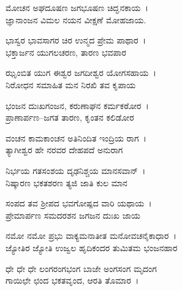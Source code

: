 \begin{myquote}
ಮೋಚನ ಅಘದೂಷಣ ಜಗಭೂಷಣ ಚಿದ್ಘನಕಾಯ~।\\ಜ್ಞಾನಾಂಜನ ವಿಮಲ ನಯನ ವೀಕ್ಷಣೆ ಮೋಹಜಾಯ.
\end{myquote}


\begin{myquote}
ಭಾಸ್ವರ ಭಾವಸಾಗರ ಚಿರ ಉನ್ಮದ ಪ್ರೇಮ ಪಾಥಾರ~।\\ಭಕ್ತಾರ್ಜನ ಯುಗಲಚರಣ, ತಾರಣ ಭವಪಾರ
\end{myquote}


\begin{myquote}
ಝೃಂಬಿತ ಯುಗ ಈಶ್ವರ ಜಗದೀಶ್ವರ ಯೋಗಸಹಾಯ~।\\ನಿರೋಧನ ಸಮಾಹಿತ ಮನ ನಿರಖಿ ತವ ಕೃಪಾಯ
\end{myquote}


\begin{myquote}
ಭಂಜನ ದುಃಖಗಂಜನ, ಕರುಣಾಘನ ಕರ್ಮಕಠೋರ~।\\ಪ್ರಾಣಾರ್ಪಣ–ಜಗತ ತಾರಣ, ಕೃಂತನ ಕಲಿಡೋರ
\end{myquote}


\begin{myquote}
ವಂಚನ ಕಾಮಕಾಂಚನ ಅತಿನಿಂದಿತ ಇಂದ್ರಿಯ ರಾಗ~।\\ತ್ಯಾಗೀಶ್ವರ ಹೇ ನರವರ ದೇಹಪದೆ ಅನುರಾಗ
\end{myquote}


\begin{myquote}
ನಿರ್ಭಯ ಗತಸಂಶಯ ದೃಢನಿಶ್ಚಯ ಮಾನಸವಾನ್~।\\ನಿಷ್ಕಾರಣ ಭಕತಶರಣ ತ್ಯಜಿ ಜಾತಿ ಕುಲ ಮಾನ
\end{myquote}


\begin{myquote}
ಸಂಪದ ತವ ಶ‍್ರೀಪದ ಭವಗೋಷ್ಪದ ವಾರಿ ಯಥಾಯ~।\\ಪ್ರೇಮಾರ್ಪಣ ಸಮದರಶನ ಜಗಜನ ದುಃಖ ಜಾಯ
\end{myquote}


\begin{myquote}
ನಮೋ ನಮೋ ಪ್ರಭು ವಾಕ್ಯಮನಾತೀತ ಮನೋವಚನೈಕಾಧಾರ~।\\ಜ್ಯೋತಿರ ಜ್ಯೋತಿ ಉಜ್ವಲ ಹೃದಿಕಂದರ ತುಮಿತಮ ಭಂಜನಹಾರ
\end{myquote}


\begin{myquote}
ಧೇ ಧೇ ಧೇ ಲಂಗರಂಗಭಂಗ ಬಾಜೇ ಅಂಗಸಂಗ ಮೃದಂಗ\\ಗಾಯಿಛೇ ಛಂದ ಭಕತವೃಂದ, ಆರತಿ ತೊಮಾರ~।
\end{myquote}

